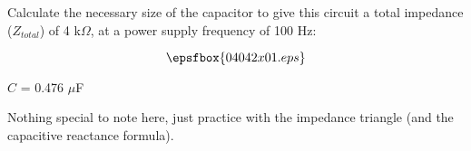 

Calculate the necessary size of the capacitor to give this circuit a total impedance ($Z_{total}$) of 4 k$\Omega$, at a power supply frequency of 100 Hz:

$$\epsfbox{04042x01.eps}$$







$C$ = 0.476 $\mu$F







Nothing special to note here, just practice with the impedance triangle (and the capacitive reactance formula).




